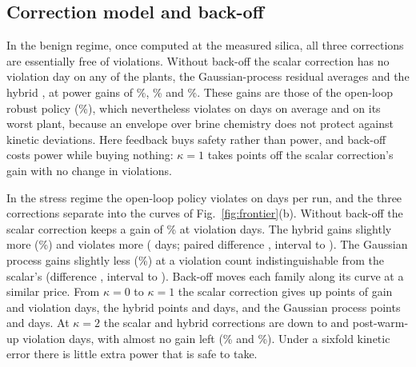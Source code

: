 \subsection{Correction model and back-off}\label{sec:models}

In the benign regime, once computed at the measured silica, all three
corrections are essentially free of violations. Without back-off the
scalar correction has no violation day on any of the 
plants, the Gaussian-process residual averages  and the
hybrid , at power gains of \%,
\% and \%. These gains are those of the
open-loop robust policy (\%), which nevertheless violates
on  days on average and  on its worst
plant, because an envelope over brine chemistry does not protect
against kinetic deviations. Here feedback buys safety rather than
power, and back-off costs power while buying nothing: $\kappa = 1$
takes  points off the scalar correction's gain with no change
in violations.

In the stress regime the open-loop policy violates on 
days per run, and the three corrections separate into the curves of
Fig.~\ref{fig:frontier}(b). Without back-off the scalar correction keeps
a gain of \% at  violation days. The
hybrid gains slightly more (\%) and violates more
( days; paired difference , interval
 to ). The Gaussian process gains
slightly less (\%) at a violation count
indistinguishable from the scalar's (difference ,
interval  to ). Back-off moves each
family along its curve at a similar price. From $\kappa = 0$ to
$\kappa = 1$ the scalar correction gives up  points of
gain and  violation days, the hybrid
 points and  days, and the Gaussian
process  points and  days. At
$\kappa = 2$ the scalar and hybrid corrections are down to
 and  post-warm-up violation days, with
almost no gain left (\% and \%). Under a
sixfold kinetic error there is little extra power that is safe to take.

